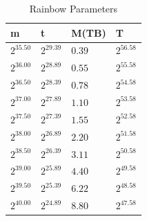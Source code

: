 \begin{table}[H]
  \centering
  \begin{tabular}{llll}
    m & t & M(TB) & T \\ \hline
    $2^{35.50}$ & $2^{29.39}$ & $0.39$ & $2^{56.58}$ \\
    $2^{36.00}$ & $2^{28.89}$ & $0.55$ & $2^{55.58}$ \\
    $2^{36.50}$ & $2^{28.39}$ & $0.78$ & $2^{54.58}$ \\
    $2^{37.00}$ & $2^{27.89}$ & $1.10$ & $2^{53.58}$ \\
    $2^{37.50}$ & $2^{27.39}$ & $1.55$ & $2^{52.58}$ \\
    $2^{38.00}$ & $2^{26.89}$ & $2.20$ & $2^{51.58}$ \\
    $2^{38.50}$ & $2^{26.39}$ & $3.11$ & $2^{50.58}$ \\
    $2^{39.00}$ & $2^{25.89}$ & $4.40$ & $2^{49.58}$ \\
    $2^{39.50}$ & $2^{25.39}$ & $6.22$ & $2^{48.58}$ \\
    $2^{40.00}$ & $2^{24.89}$ & $8.80$ & $2^{47.58}$ \\
  \end{tabular}
  \caption{Rainbow Parameters}
  \label{tab:rainparam}
\end{table}
